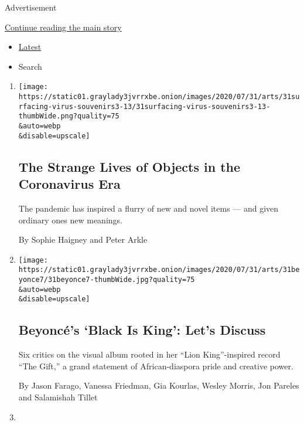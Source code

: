 Advertisement

\protect\hyperlink{after-mid1}{Continue reading the main story}

\begin{itemize}
\tightlist
\item
  \protect\hyperlink{stream-panel}{Latest}
\item
  Search
\end{itemize}

\begin{enumerate}
\def\labelenumi{\arabic{enumi}.}
\item
  \href{/2020/08/01/arts/design/virus-design-objects.html}{}

  \texttt{[image: https://static01.graylady3jvrrxbe.onion/images/2020/07/31/arts/31surfacing-virus-souvenirs3-13/31surfacing-virus-souvenirs3-13-thumbWide.png?quality=75\\\&auto=webp\\\&disable=upscale]}

  \hypertarget{the-strange-lives-of-objects-in-the-coronavirus-era}{%
  \subsection{The Strange Lives of Objects in the Coronavirus
  Era}\label{the-strange-lives-of-objects-in-the-coronavirus-era}}

  The pandemic has inspired a flurry of new and novel items --- and
  given ordinary ones new meanings.

  By Sophie Haigney and Peter Arkle
\item
  \href{/2020/07/31/arts/music/beyonce-black-is-king.html}{}

  \texttt{[image: https://static01.graylady3jvrrxbe.onion/images/2020/07/31/arts/31beyonce7/31beyonce7-thumbWide.jpg?quality=75\\\&auto=webp\\\&disable=upscale]}

  \hypertarget{beyoncuxe9s-black-is-king-lets-discuss}{%
  \subsection{Beyoncé's `Black Is King': Let's
  Discuss}\label{beyoncuxe9s-black-is-king-lets-discuss}}

  Six critics on the visual album rooted in her ``Lion King''-inspired
  record ``The Gift,'' a grand statement of African-diaspora pride and
  creative power.

  By Jason Farago, Vanessa Friedman, Gia Kourlas, Wesley Morris, Jon
  Pareles and Salamishah Tillet
\item
  \href{/2020/07/31/arts/design/heather-phillipson-fourth-plinth.html}{}


\end{enumerate}
